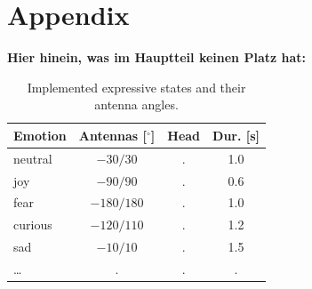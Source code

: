 \documentclass[conference]{IEEEtran}
\begin{document}
\section*{Appendix}
\color{twblue}\textbf{Hier hinein, was im Hauptteil keinen Platz hat:}\color{black}
\begin{table}[!h]
    \centering
    \setlength{\tabcolsep}{0.5em}
    {\renewcommand{\arraystretch}{1.2}
    \begin{tabular}{|l|c|c|c|}
        \hline
        \textbf{Emotion} & \textbf{Antennas [$^\circ$]} & \textbf{Head} & \textbf{Dur. [s]} \\ \hline
        neutral & $-30 / 30$ & . & 1.0 \\ \hline
        joy & $-90 / 90$ & . & 0.6 \\ \hline
        fear & $-180 / 180$ & . & 1.0 \\ \hline
        curious & $-120 / 110$ & . & 1.2 \\ \hline
        sad & $-10 / 10$ & . & 1.5 \\ \hline
        \ldots & . & . & . \\ \hline
    \end{tabular}}
    \caption{Implemented expressive states and their antenna angles.}
    \label{tab:repertoire}
\end{table}

\end{document}

